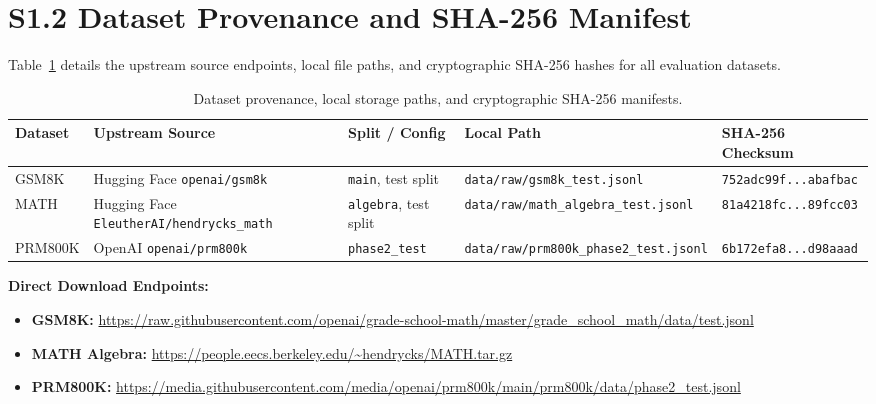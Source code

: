 \documentclass[11pt,letterpaper]{article}
\begin{document}
\section{S1.2 Dataset Provenance and SHA-256 Manifest}\label{sec:s12-dataset-provenance}

Table~\ref{tab:s1-dataset-provenance} details the upstream source endpoints, local file paths, and cryptographic SHA-256 hashes for all evaluation datasets.

\begin{table}[htbp]
\centering
\small
\caption{Dataset provenance, local storage paths, and cryptographic SHA-256 manifests.}
\label{tab:s1-dataset-provenance}
\begin{tabular}{lllll}
\toprule
Dataset & Upstream Source & Split / Config & Local Path & SHA-256 Checksum \\
\midrule
GSM8K & Hugging Face \texttt{openai/gsm8k} & \texttt{main}, test split & \texttt{data/raw/gsm8k\_test.jsonl} & \texttt{752adc99f...abafbac} \\
MATH & Hugging Face \texttt{EleutherAI/hendrycks\_math} & \texttt{algebra}, test split & \texttt{data/raw/math\_algebra\_test.jsonl} & \texttt{81a4218fc...89fcc03} \\
PRM800K & OpenAI \texttt{openai/prm800k} & \texttt{phase2\_test} & \texttt{data/raw/prm800k\_phase2\_test.jsonl} & \texttt{6b172efa8...d98aaad} \\
\bottomrule
\end{tabular}
\end{table}

\textbf{Direct Download Endpoints:}
\begin{itemize}
    \item \textbf{GSM8K:} \url{https://raw.githubusercontent.com/openai/grade-school-math/master/grade_school_math/data/test.jsonl}
    \item \textbf{MATH Algebra:} \url{https://people.eecs.berkeley.edu/~hendrycks/MATH.tar.gz}
    \item \textbf{PRM800K:} \url{https://media.githubusercontent.com/media/openai/prm800k/main/prm800k/data/phase2_test.jsonl}
\end{itemize}

\end{document}
